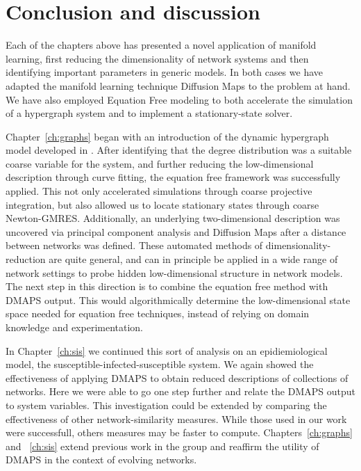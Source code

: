 \chapter{Conclusion and discussion \label{ch:conc}}

Each of the chapters above has presented a novel application of
manifold learning, first reducing the dimensionality of network
systems and then identifying important parameters in generic
models. In both cases we have adapted the manifold learning technique
Diffusion Maps to the problem at hand. We have also employed Equation
Free modeling to both accelerate the simulation of a hypergraph system
and to implement a stationary-state solver.

Chapter~\ref{ch:graphs} began with an introduction of the dynamic
hypergraph model developed in \cite{Balazs}. After identifying that
the degree distribution was a suitable coarse variable for the system,
and further reducing the low-dimensional description through curve
fitting, the equation free framework was successfully applied. This
not only accelerated simulations through coarse projective
integration, but also allowed us to locate stationary states through
coarse Newton-GMRES. Additionally, an underlying two-dimensional
description was uncovered via principal component analysis and
Diffusion Maps after a distance between networks was defined. These
automated methods of dimensionality-reduction are quite general, and
can in principle be applied in a wide range of network settings to
probe hidden low-dimensional structure in network models. The next
step in this direction is to combine the equation free method with
DMAPS output. This would algorithmically determine the low-dimensional
state space needed for equation free techniques, instead of relying on
domain knowledge and experimentation.

In Chapter~\ref{ch:sis} we continued this sort of analysis on an
epidiemiological model, the susceptible-infected-susceptible
system. We again showed the effectiveness of applying DMAPS to obtain
reduced descriptions of collections of networks. Here we were able to
go one step further and relate the DMAPS output to system
variables. This investigation could be extended by comparing the
effectiveness of other network-similarity measures. While those used
in our work were successfull, others measures may be faster to
compute. Chapters~\ref{ch:graphs} and ~\ref{ch:sis} extend previous
work in the group and reaffirm the utility of DMAPS in the context of
evolving networks.

